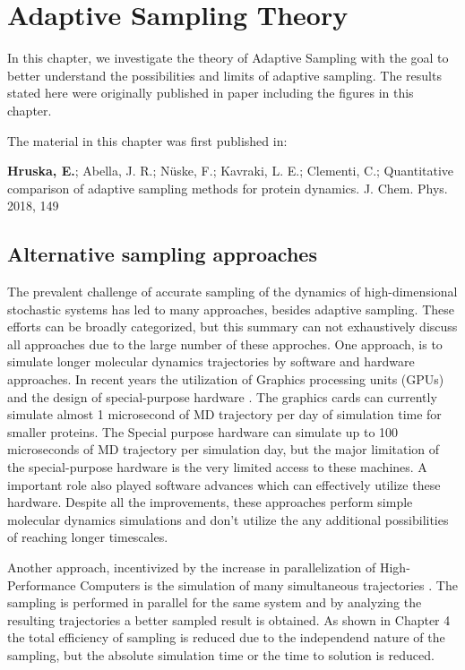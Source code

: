 \afterpage{\null\newpage}
\chapter{Adaptive Sampling Theory\label{ch:chapter3}}


In this chapter, we investigate the theory of Adaptive Sampling with the goal to better understand the possibilities and limits of adaptive sampling. The results stated here were originally published in paper  including the figures in this chapter.

The material in this chapter was first published in: 

\cite{Adstrategies2018} \textbf{Hruska, E.}; Abella, J. R.; N\"uske, F.;
Kavraki, L. E.; Clementi, C.; Quantitative
comparison of adaptive sampling methods
for protein dynamics. J. Chem. Phys.
2018, 149 




\section{\label{sec:intro2}Alternative sampling approaches}


The prevalent challenge of accurate sampling of the dynamics of high-dimensional stochastic systems  has led to many approaches, besides adaptive sampling.
These efforts can be broadly categorized, but this summary can not exhaustively discuss all approaches due to the large number of these approches.
One approach, is to simulate longer molecular dynamics trajectories by software and hardware approaches. In recent years the utilization of Graphics processing units (GPUs) and the design of special-purpose hardware \cite{shaw2014anton}. The graphics cards can currently simulate almost 1 microsecond of MD trajectory per day of simulation time for smaller proteins. The Special purpose hardware can simulate up to 100 microseconds of MD trajectory per simulation day, but the major limitation of the special-purpose hardware is the very limited access to these machines. A important role also played software advances which can effectively utilize these hardware. Despite all the improvements, these approaches perform simple molecular dynamics simulations and don't utilize the any additional possibilities of reaching longer timescales.

Another approach, incentivized by the increase in parallelization of High-Performance Computers is the simulation of many simultaneous trajectories \cite{DistComp-Shirts2000, DistComp-Buch2010}. The sampling is performed in parallel for the same system and by analyzing the resulting trajectories a better sampled result is obtained.  As shown in Chapter 4 the total efficiency of sampling is reduced due to the independend nature of the sampling, but the absolute simulation time or the time to solution is reduced.

